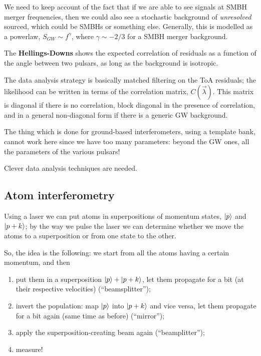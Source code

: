 \documentclass[main.tex]{subfiles}
\begin{document}
We need to keep account of the fact that if we are able to see signals at SMBH merger frequencies, then we could also see a stochastic background of \emph{unresolved} sourced, which could be SMBHs or something else.
Generally, this is modelled as a powerlaw, \(S_{GW} \sim f^{\gamma }\), where \(\gamma \sim - 2/3\) for a SMBH merger background.

The \textbf{Hellings-Downs} shows the expected correlation of residuals as a function of the angle between two pulsars, as long as the background is isotropic. 

The data analysis strategy is basically matched filtering on the ToA residuals; the likelihood can be written in terms of the  correlation matrix, \(C(\vec{\lambda})\). This matrix is diagonal if there is no correlation, block diagonal in the presence of correlation, and in a general non-diagonal form if there is a generic GW background. 

The thing which is done for ground-based interferometers, using a template bank, cannot work here since we have too many parameters: beyond the GW ones, all the parameters of the various pulsars! 

Clever data analysis techniques are needed.

\subsection{Atom interferometry}

Using a laser we can put atoms in superpositions of momentum states, \(\ket{p}\) and \(\ket{p + k}\); by the way we pulse the laser we can determine whether we move the atoms to a superposition or from one state to the other. 

So, the idea is the following: we start from all the atoms having a certain momentum, and then
\begin{enumerate}
    \item put them in a superposition \(\ket{p} + \ket{p+k}\), let them propagate for a bit (at their respective velocities) (``beamsplitter'');
    \item invert the population: map \(\ket{p}\) into \(\ket{p + k}\) and vice versa, let them propagate for a bit again (same time as before) (``mirror'');
    \item apply the superposition-creating beam again (``beamplitter'');
    \item measure!
\end{enumerate}
\end{document}
